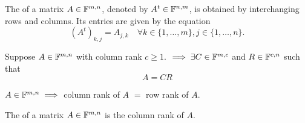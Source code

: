 \setcounter{thm}{53}
\begin{mydef}[transpose, $A^t$]
  \label{def: transpose}
  The  of a matrix $A\in \mathbb{F}^{m,n}$, denoted by $A^t\in \mathbb{F}^{n,m}$, is obtained by interchanging rows and columns. Its entries are given by the equation
  \begin{equation}
    \left( A^{t} \right)_{k,j} = A_{j,k} \quad \forall k \in \{1, \ldots, m\}, j \in \{1, \ldots, n\}. 
  \end{equation}
\end{mydef}

\setcounter{thm}{55}
\begin{thm}
  Suppose $A \in \mathbb{F}^{m,n}$ with column rank $c \geq 1.$ $\implies \exists C\in \mathbb{F}^{m,c}$ and $R\in \mathbb{F}^{c,n}$ such that
  \begin{equation}
    A = CR
  \end{equation}
\end{thm}

\begin{thm}
  $A\in \mathbb{F}^{m,n} \implies$ column rank of $A$ $=$ row rank of $A$.
\end{thm}

\begin{mydef} [rank]
  The  of a matrix $A \in  \mathbb{F}^{m,n}$ is the column rank of $A$.
\end{mydef}